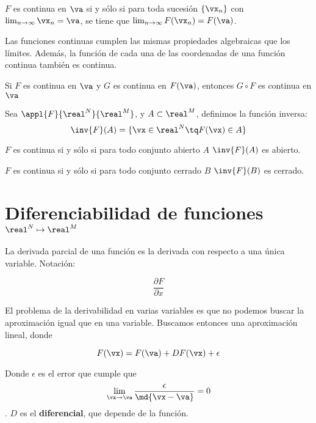 \documentclass[12pt,a4paper,titlepage]{apuntes}
\begin{document}
\begin{theorem}
$F$ es continua en $\va$ si y sólo si para toda sucesión $\{\vx_n\}$ con $\lim_{n\to\infty} \vx_n = \va$, se tiene que $\lim_{n\to\infty} F(\vx_n) = F(\va)$.
\end{theorem}

Las funciones continuas cumplen las mismas propiedades algebraicas que los límites. Además, la función de cada una de las coordenadas de una función continua también es continua.
\begin{theorem}
Si $F$ es continua en $\va$ y $G$ es continua en $F(\va)$, entonces $G\circ F$ es continua en $\va$
\end{theorem}
\begin{defn}[Inversa]
Sea $\appl{F}{\real^N}{\real^M}$, y $A\subset \real^M$, definimos la función inversa: \[\inv{F}(A) = \{ \vx\in\real^N\tq F(\vx) \in A \}\]
\end{defn}

\begin{theorem}
$F$ es continua si y sólo si para todo conjunto abierto $A$ $\inv{F}(A)$ es abierto.
\end{theorem}

\begin{theorem}
$F$ es continua si y sólo si para todo conjunto cerrado $B$ $\inv{F}(B)$ es cerrado.
\end{theorem}

\section{Diferenciabilidad de funciones $\real^N \mapsto \real^M$}

\begin{defn}
La derivada parcial de una función es la derivada con respecto a una única variable. Notación: 

\[ \frac{\partial F}{\partial x} \]
\end{defn}


El problema de la derivabilidad en varias variables es que no podemos buscar la aproximación igual que en una variable. Buscamos entonces una aproximación lineal, donde

\[ F(\vx) = F(\va) +DF(\vx) + \epsilon \]

Donde $\epsilon$ es el error que cumple que \[\lim_{\vx\to\va} \frac{\epsilon}{\md{\vx-\va}} =0\]. $D$ es el \textbf{diferencial}, que depende de la función.
\end{document}
